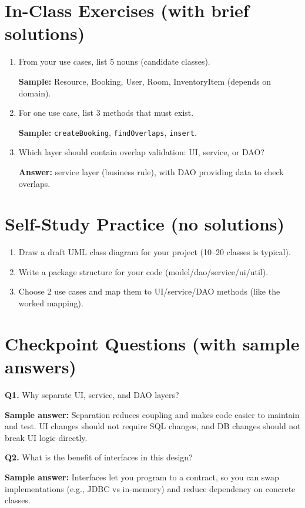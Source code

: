 \documentclass[11pt]{article}
\begin{document}
\section{In-Class Exercises (with brief solutions)}
\begin{enumerate}
  \item From your use cases, list 5 nouns (candidate classes).\par
  \textbf{Sample:} Resource, Booking, User, Room, InventoryItem (depends on domain).

  \item For one use case, list 3 methods that must exist.\par
  \textbf{Sample:} \texttt{createBooking}, \texttt{findOverlaps}, \texttt{insert}.

  \item Which layer should contain overlap validation: UI, service, or DAO?\par
  \textbf{Answer:} service layer (business rule), with DAO providing data to check overlaps.
\end{enumerate}

\section{Self-Study Practice (no solutions)}
\begin{enumerate}
  \item Draw a draft UML class diagram for your project (10--20 classes is typical).
  \item Write a package structure for your code (model/dao/service/ui/util).
  \item Choose 2 use cases and map them to UI/service/DAO methods (like the worked mapping).
\end{enumerate}

\section{Checkpoint Questions (with sample answers)}
\textbf{Q1.} Why separate UI, service, and DAO layers?\par
\textbf{Sample answer:} Separation reduces coupling and makes code easier to maintain and test. UI changes should not require SQL changes, and DB changes should not break UI logic directly.

\vspace{0.6em}
\textbf{Q2.} What is the benefit of interfaces in this design?\par
\textbf{Sample answer:} Interfaces let you program to a contract, so you can swap implementations (e.g., JDBC vs in-memory) and reduce dependency on concrete classes.
\end{document}
